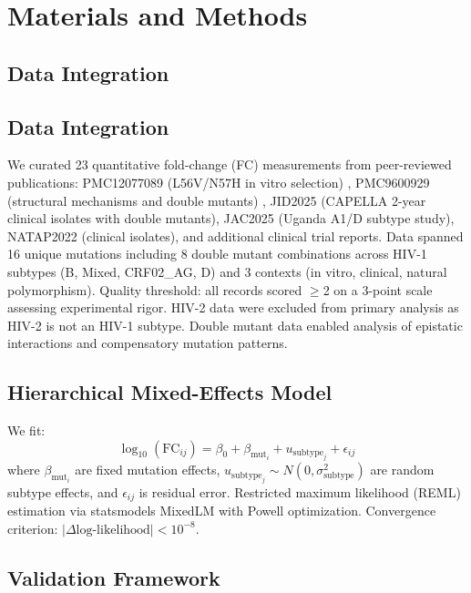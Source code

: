 \documentclass[preprint]{elsarticle}
\begin{document}
\section{Materials and Methods}

\subsection{Data Integration}

\subsection{Data Integration}

We curated 23 quantitative fold-change (FC) measurements from peer-reviewed publications: PMC12077089 (L56V/N57H in vitro selection) \cite{Andreatta2024}, PMC9600929 (structural mechanisms and double mutants) \cite{Yant2022}, JID2025 (CAPELLA 2-year clinical isolates with double mutants), JAC2025 (Uganda A1/D subtype study), NATAP2022 (clinical isolates), and additional clinical trial reports. Data spanned 16 unique mutations including 8 double mutant combinations across HIV-1 subtypes (B, Mixed, CRF02\_AG, D) and 3 contexts (in vitro, clinical, natural polymorphism). Quality threshold: all records scored $\geq$2 on a 3-point scale assessing experimental rigor. HIV-2 data were excluded from primary analysis as HIV-2 is not an HIV-1 subtype. Double mutant data enabled analysis of epistatic interactions and compensatory mutation patterns.

\subsection{Hierarchical Mixed-Effects Model}

We fit:
\begin{equation}
\log_{10}(\text{FC}_{ij}) = \beta_0 + \beta_{\text{mut}_i} + u_{\text{subtype}_j} + \epsilon_{ij}
\end{equation}
where $\beta_{\text{mut}_i}$ are fixed mutation effects, $u_{\text{subtype}_j} \sim N(0, \sigma^2_{\text{subtype}})$ are random subtype effects, and $\epsilon_{ij}$ is residual error. Restricted maximum likelihood (REML) estimation via statsmodels MixedLM with Powell optimization. Convergence criterion: $|\Delta\text{log-likelihood}| < 10^{-8}$.

\subsection{Validation Framework}
\end{document}
